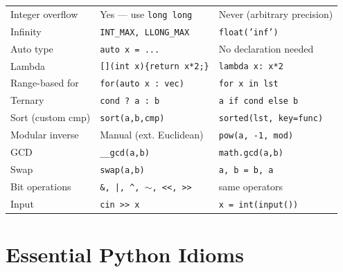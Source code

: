 \documentclass[11pt,a4paper]{report}
\begin{document}
\begin{longtable}{@{}lll@{}}
Integer overflow    & Yes --- use \texttt{long long}   & Never (arbitrary precision) \\
Infinity            & \texttt{INT\_MAX, LLONG\_MAX}    & \texttt{float('inf')} \\
Auto type           & \texttt{auto x = ...}            & No declaration needed \\
Lambda              & \texttt{[](int x)\{return x*2;\}}& \texttt{lambda x: x*2} \\
Range-based for     & \texttt{for(auto x : vec)}       & \texttt{for x in lst} \\
Ternary             & \texttt{cond ? a : b}            & \texttt{a if cond else b} \\
Sort (custom cmp)   & \texttt{sort(a,b,cmp)}           & \texttt{sorted(lst, key=func)} \\
Modular inverse     & Manual (ext. Euclidean)          & \texttt{pow(a, -1, mod)} \\
GCD                 & \texttt{\_\_gcd(a,b)}            & \texttt{math.gcd(a,b)} \\
Swap                & \texttt{swap(a,b)}               & \texttt{a, b = b, a} \\
Bit operations      & \texttt{\&, |, \^{}, $\sim$, <<, >>} & same operators \\
Input               & \texttt{cin >> x}                & \texttt{x = int(input())} \\
\bottomrule
\end{longtable}

\section{Essential Python Idioms}
\end{document}
